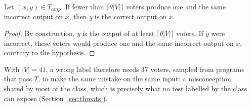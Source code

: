 \documentclass[acmsmall,screen,review,anonymous,nonacm]{acmart}
\newcommand{\V}[1]{\ensuremath{\mathit{#1}}}
\begin{document}
\begin{proposition}\label{prop:label}
Let $(x, y) \in T_{\V{amp}}$. If fewer than $\lceil \theta |V| \rceil$ voters produce one and the same incorrect output on $x$, then $y$ is the correct output on $x$.
\end{proposition}
\begin{proof}
By construction, $y$ is the output of at least $\lceil \theta |V| \rceil$ voters. If $y$ were incorrect, these voters would produce one and the same incorrect output on $x$, contrary to the hypothesis.
\end{proof}
With $|V| = 41$, a wrong label therefore needs 37 voters, sampled from programs that pass $T$, to make the same mistake on the same input: a misconception shared by most of the class, which is precisely what no test labelled by the class can expose (Section~\ref{sec:threats}).
\end{document}
